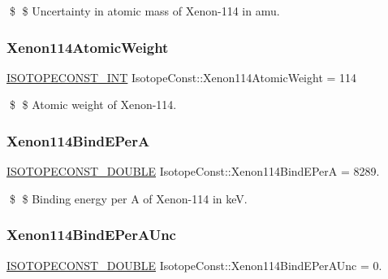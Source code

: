 \$ \$ Uncertainty in atomic mass of Xenon-\/114 in amu. \mbox{\label{group___isotope_const-_xenon-_xe114_gae7f6101c31a21f829cb996441941be39}} 
\subsubsection{\texorpdfstring{Xenon114\+Atomic\+Weight}{Xenon114AtomicWeight}}
{\footnotesize\ttfamily \mbox{\hyperlink{group___isotope_const-_macros_ga5f18360b3e99483a35c32d789e62621c}{I\+S\+O\+T\+O\+P\+E\+C\+O\+N\+S\+T\+\_\+\+I\+NT}} Isotope\+Const\+::\+Xenon114\+Atomic\+Weight = 114}

\$ \$ Atomic weight of Xenon-\/114. \mbox{\label{group___isotope_const-_xenon-_xe114_ga28b37c239db4eaab878f3330fecd6d3d}} 
\subsubsection{\texorpdfstring{Xenon114\+Bind\+E\+PerA}{Xenon114BindEPerA}}
{\footnotesize\ttfamily \mbox{\hyperlink{group___isotope_const-_macros_ga8f45a7272ce02c0b4c65c44636ed719a}{I\+S\+O\+T\+O\+P\+E\+C\+O\+N\+S\+T\+\_\+\+D\+O\+U\+B\+LE}} Isotope\+Const\+::\+Xenon114\+Bind\+E\+PerA = 8289.}

\$ \$ Binding energy per A of Xenon-\/114 in keV. \mbox{\label{group___isotope_const-_xenon-_xe114_gad6187571dde262d1b49efb091c8bd8e3}} 
\subsubsection{\texorpdfstring{Xenon114\+Bind\+E\+Per\+A\+Unc}{Xenon114BindEPerAUnc}}
{\footnotesize\ttfamily \mbox{\hyperlink{group___isotope_const-_macros_ga8f45a7272ce02c0b4c65c44636ed719a}{I\+S\+O\+T\+O\+P\+E\+C\+O\+N\+S\+T\+\_\+\+D\+O\+U\+B\+LE}} Isotope\+Const\+::\+Xenon114\+Bind\+E\+Per\+A\+Unc = 0.}

